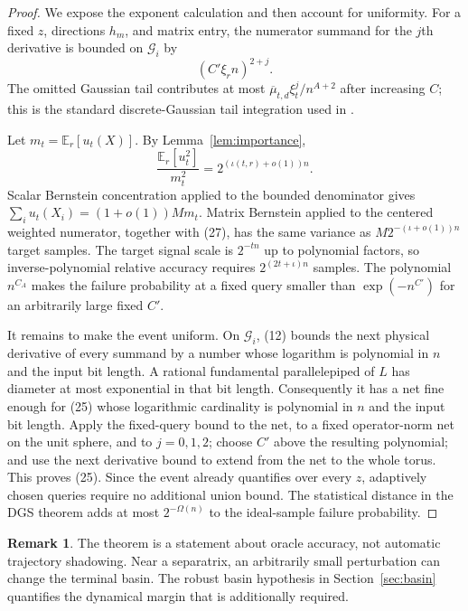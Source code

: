 \documentclass[10pt]{article}
\theoremstyle{definition}
\newtheorem{remark}[theorem]{Remark}
\newcommand{\E}{\mathbb{E}}
\newcommand{\cG}{\mathcal{G}}
\begin{document}
\begin{proof}
We expose the exponent calculation and then account for uniformity.
For a fixed $z$, directions $h_m$, and matrix entry, the numerator summand
for the $j$th derivative is bounded on $\cG_i$ by
\[
 (C'\xi_r n)^{2+j}.                                               \tag{26}
\]
The omitted Gaussian tail contributes at most
$\overline\mu_{t,d}\xi_t^j/n^{A+2}$ after increasing $C$; this is the
standard discrete-Gaussian tail integration used in \cite{Hhan26}.

Let $m_t=\E_r[u_t(X)]$.  By Lemma~\ref{lem:importance},
\[
 \frac{\E_r[u_t^2]}{m_t^2}=2^{(\iota(t,r)+o(1))n}.                 \tag{27}
\]
Scalar Bernstein concentration applied to the bounded denominator gives
$\sum_i u_t(X_i)=(1+o(1))Mm_t$.  Matrix Bernstein applied to the centered
weighted numerator, together with (27), has the same variance as
$M2^{-(\iota+o(1))n}$ target samples.  The target signal scale is
$2^{-tn}$ up to polynomial factors, so inverse-polynomial relative accuracy
requires $2^{(2t+\iota)n}$ samples.  The polynomial $n^{C_A}$ makes the
failure probability at a fixed query smaller than
$\exp(-n^{C'})$ for an arbitrarily large fixed $C'$.

It remains to make the event uniform.  On $\cG_i$, (12) bounds the next
physical derivative of every summand by a number whose logarithm is
polynomial in $n$ and the input bit length.  A rational fundamental
parallelepiped of $L$ has diameter at most exponential in that bit length.
Consequently it has a net fine enough for (25) whose logarithmic cardinality
is polynomial in $n$ and the input bit length.  Apply the fixed-query bound
to the net, to a fixed operator-norm net on the unit sphere, and to
$j=0,1,2$; choose $C'$ above the resulting polynomial; and use the next
derivative bound to extend from the net to the whole torus.  This proves
(25).  Since the event already quantifies over every $z$, adaptively chosen
queries require no additional union bound.  The statistical distance in the
DGS theorem adds at most $2^{-\Omega(n)}$ to the ideal-sample failure
probability.
\end{proof}

\begin{remark}
The theorem is a statement about oracle accuracy, not automatic trajectory
shadowing.  Near a separatrix, an arbitrarily small perturbation can change
the terminal basin.  The robust basin hypothesis in Section~\ref{sec:basin}
quantifies the dynamical margin that is additionally required.
\end{remark}
\end{document}
